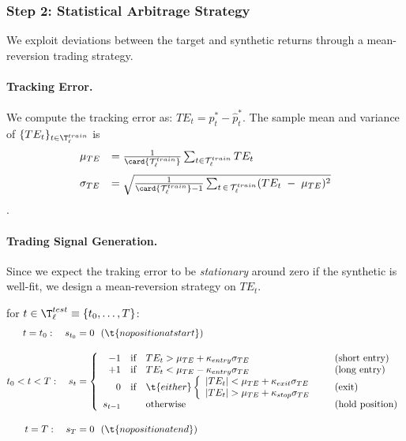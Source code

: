 \subsubsection*{Step 2: Statistical Arbitrage Strategy}

We exploit deviations between the target and synthetic returns through a mean-reversion trading strategy.

\paragraph{Tracking Error.} We compute the tracking error as:
$
TE_t = p_t^* - \widehat{p}_t^*
$. The sample mean and variance of $\{TE_t\}_{t\in\T_{\ell}^{train}}$ is
$$
\begin{array}{ll}
\mu_{TE}
&=
\frac{1}{\card{\mathcal{T}_{\ell}^{train}}}
\sum_{t\in\mathcal{T}_{\ell}^{train}}
TE_{t}
\\[1em]
\sigma_{TE}
&=
\sqrt{
\frac{1}{\card{\mathcal{T}_{\ell}^{train}}-1}
\sum_{t\,\in\,\mathcal{T}_{\ell}^{train}}(TE_{t}\;-\;\mu_{TE})^{2}
}
\end{array}
$$.

\paragraph{Trading Signal Generation.}
Since we expect the traking error to be \emph{stationary} around zero if the synthetic is well-fit, we design a mean-reversion strategy on $TE_{t}$. 

for $t\in \T_{\ell}^{test} \equiv \{t_0, \ldots, T\}$:
\begin{align*}
t=t_0: \quad  s_{t_0} &= 0 ~~(\t{no position at start})
\\[1em]
t_0<t<T: \quad s_t &=
\left\{
\begin{array}{rllll}
-1 & \text{if} & TE_t > \mu_{TE} + \kappa_{entry}\sigma_{TE} && \text{(short entry)} \\
+1 & \text{if} & TE_t < \mu_{TE} - \kappa_{entry}\sigma_{TE} && \text{(long entry)} \\
0 & \text{if} & \t{either} 
	\left\{
	\begin{array}{lll}
		|TE_t| <  \mu_{TE} + \kappa_{exit}\sigma_{TE}
		\\
		|TE_t| >\mu_{TE}+\kappa_{stop}\sigma_{TE}
	\end{array}
	\right.
	&& \text{(exit)}
	\\
s_{t-1}
 & & \text{otherwise} && \text{(hold position)}
\end{array}
\right.
\\[1em]
t=T: \quad s_T &= 0 ~~(\t{no position at end})
\end{align*}


